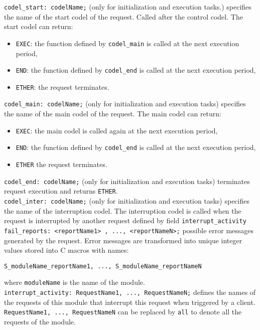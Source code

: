 \noindent
{\tt codel\_start: codelName;} (only for initialization and execution
tasks.) specifies the name of the start codel of the request. Called
after the control codel. The start codel can return:
\begin{itemize}
\item {\tt EXEC}: the function defined by {\tt codel\_main} is called
  at the next execution period,
\item {\tt END}: the function defined by {\tt codel\_end} is called at the
  next execution period,
\item {\tt ETHER}: the request terminates.
\end{itemize}

\noindent
{\tt codel\_main: codelName;} (only for initialization and execution
tasks) specifies the name of the main codel of the request. The main
codel can return:
\begin{itemize}
\item {\tt EXEC}: the main codel is called again
  at the next execution period,
\item {\tt END}: the function defined by {\tt codel\_end} is called at the
  next execution period,
\item {\tt ETHER} the request terminates.
\end{itemize}

\noindent
{\tt codel\_end:  codelName;} (only for initialization and execution
tasks) terminates request execution and returns {\tt ETHER}.\\

\noindent
{\tt codel\_inter: codelName;} (only for initialization and execution
tasks) specifies the name of the interruption codel. The interruption
codel is called when the request is interrupted by another request
defined by field {\tt interrupt\_activity}\\

\noindent
{\tt fail\_reports:  <reportName1> , ..., <reportNameN>;}
possible error messages generated by the request. Error messages are
transformed into unique integer values stored into C macros with
names:
\begin{verbatim}
S_moduleName_reportName1, ..., S_moduleName_reportNameN
\end{verbatim}
where \texttt{moduleName} is the name of the module.\\

\noindent
{\tt interrupt\_activity:	    RequestName1, ..., RequestNameN;}
defines the names of the requests of this module that interrupt this request when
triggered by a client. {\tt RequestName1, ..., RequestNameN} can be
replaced by {\tt all} to denote all the requests of the module.\\


